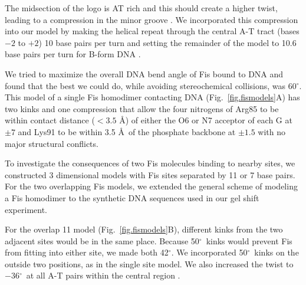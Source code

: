 \documentclass[doublespacing]{narfront}
\newcommand{\fig}[1]{Fig.~\ref{#1}} %
\newcommand{\degrees}{${}^{\circ}$}
\newcommand{\latex}[1]{#1} %
\newcommand{\html}[1]{{ }} %
\begin{document}

The midsection of the logo is AT rich
and this should create a higher twist,
leading to a compression in the minor groove
\cite{Wu.Crothers1984,Lipanov.Chuprina1987,Kostrewa1992}.
We incorporated this compression into our model
by making the helical repeat through the central A-T tract
(bases $-2$ to $+2$)
10 base pairs per turn
and setting the remainder of the model to
10.6 base pairs per turn for B-form DNA
\cite{Peck1981,Rhodes1980,Rhodes1981}.

We tried to maximize the overall DNA bend angle of Fis bound
to DNA and found that the best we could do,
while avoiding stereochemical collisions, was 60\degrees.
This model of a single Fis homodimer contacting DNA
\html{(figure 1)}%
\latex{ (\fig{fig.fismodels}A) }
has two kinks and one compression
that allow
the four nitrogens of Arg85
to be within contact distance ($<3.5$ \AA)
of either the O6 or N7 acceptor of
each G at
$\pm 7$
and Lys91 to be within 3.5 \AA\
of the phosphate backbone at $\pm 1.5$
with no major structural conflicts.


To investigate the consequences of two Fis
molecules binding to nearby sites,
we constructed 3 dimensional models with
Fis sites separated by 11 or 7 base pairs.
For the two overlapping Fis models, we extended the general scheme
of modeling a Fis homodimer
to the synthetic DNA sequences
used in our gel shift experiment.

For the overlap 11 model
\html{(figure 2),}%
\latex{(\fig{fig.fismodels}B),}
different kinks from the two adjacent sites would be in the same
place.
Because 50\degrees\ kinks would prevent Fis from fitting into either site,
we made both 42\degrees.
We incorporated 50\degrees\ kinks
on the outside two positions, as in the
single site model.  We also increased the twist to $-36$\degrees\ at
all A-T pairs within the central region
\cite{Goodsell1994}.
\end{document}
